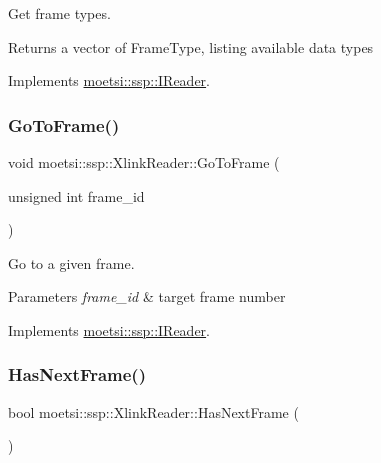 Get frame types. 

\begin{DoxyReturn}{Returns}
a vector of Frame\+Type, listing available data types 
\end{DoxyReturn}


Implements \hyperlink{classmoetsi_1_1ssp_1_1IReader_a4116c1931fde7bd66133934ffdca1cce}{moetsi\+::ssp\+::\+I\+Reader}.

\mbox{\label{classmoetsi_1_1ssp_1_1XlinkReader_af540d074aeb4d3075db45c246fd48627}} 
\subsubsection{\texorpdfstring{Go\+To\+Frame()}{GoToFrame()}}
{\footnotesize\ttfamily void moetsi\+::ssp\+::\+Xlink\+Reader\+::\+Go\+To\+Frame (\begin{DoxyParamCaption}\item[{unsigned int}]{frame\+\_\+id }\end{DoxyParamCaption})\hspace{0.3cm}{\ttfamily [virtual]}}



Go to a given frame. 


\begin{DoxyParams}{Parameters}
{\em frame\+\_\+id} & target frame number \\
\hline
\end{DoxyParams}


Implements \hyperlink{classmoetsi_1_1ssp_1_1IReader_a6f1be3c06538992cca6d550bd9566681}{moetsi\+::ssp\+::\+I\+Reader}.

\mbox{\label{classmoetsi_1_1ssp_1_1XlinkReader_ab57ff571372fbbe18f4f5f96e4bc7c21}} 
\subsubsection{\texorpdfstring{Has\+Next\+Frame()}{HasNextFrame()}}
{\footnotesize\ttfamily bool moetsi\+::ssp\+::\+Xlink\+Reader\+::\+Has\+Next\+Frame (\begin{DoxyParamCaption}{ }\end{DoxyParamCaption})\hspace{0.3cm}{\ttfamily [virtual]}}



